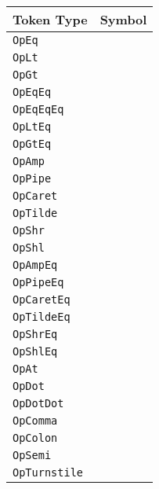 \begin{table}[H]
\parbox[t]{0.45\linewidth}{
    \centering
    \begin{tabular}[t]{|ll|}
        \hline
        \textbf{Token Type} & \textbf{Symbol} \\
        \hline
        \texttt{OpEq} & \op{=} \\
        \texttt{OpLt} & \op{<} \\
        \texttt{OpGt} & \op{>} \\
        \texttt{OpEqEq} & \op{==} \\
        \texttt{OpEqEqEq} & \op{===} \\
        \texttt{OpLtEq} & \op{<=} \\
        \texttt{OpGtEq} & \op{>=} \\
        \hline
        \texttt{OpAmp} & \op{\&} \\
        \texttt{OpPipe} & \op{|} \\
        \texttt{OpCaret} & \op{\textasciicircum} \\
        \texttt{OpTilde} & \op{\textasciitilde} \\
        \texttt{OpShr} & \op{\textasciitilde>} \\
        \texttt{OpShl} & \op{<\textasciitilde} \\
        \hline
        \texttt{OpAmpEq} & \op{\&=} \\
        \texttt{OpPipeEq} & \op{|=} \\
        \texttt{OpCaretEq} & \op{\textasciicircum=} \\
        \texttt{OpTildeEq} & \op{\textasciitilde=} \\
        \texttt{OpShrEq} & \op{\textasciitilde>=} \\
        \texttt{OpShlEq} & \op{<\textasciitilde=} \\
        \hline
        \texttt{OpAt} & \op{@} \\
        \texttt{OpDot} & \op{.} \\
        \texttt{OpDotDot} & \op{..} \\
        \texttt{OpComma} & \op{,} \\
        \texttt{OpColon} & \op{:} \\
        \texttt{OpSemi} & \op{;} \\
        \texttt{OpTurnstile} & \op{<-} \\
        \hline
    \end{tabular}
}
\hfill
\parbox[t]{0.45\linewidth}{
    \centering
    \begin{tabular}[t]{|ll|}

\end{tabular}}
\end{table}

